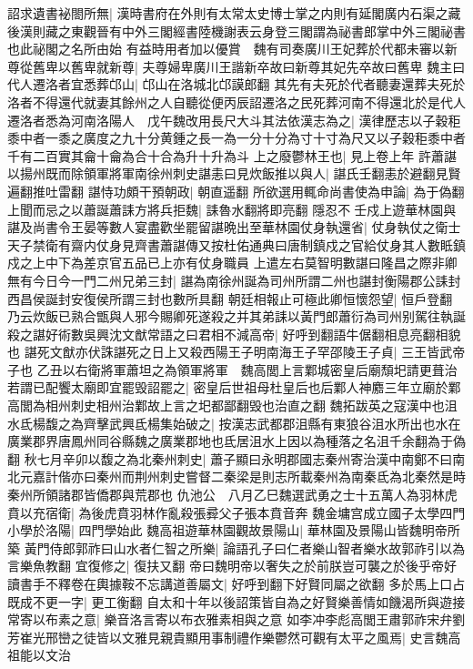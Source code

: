 詔求遺書袐閤所無|{
	漢時書府在外則有太常太史博士掌之内則有延閣廣内石渠之藏後漢則藏之東觀晉有中外三閣經書陸機謝表云身登三閣謂為祕書郎掌中外三閣祕書也此祕閣之名所由始}
有益時用者加以優賞　魏有司奏廣川王妃葬於代都未審以新尊從舊卑以舊卑就新尊|{
	夫尊婦卑廣川王諧新卒故曰新尊其妃先卒故曰舊卑}
魏主曰代人遷洛者宜悉葬邙山|{
	邙山在洛城北邙謨郎翻}
其先有夫死於代者聽妻還葬夫死於洛者不得還代就妻其餘州之人自聽從便丙辰詔遷洛之民死葬河南不得還北於是代人遷洛者悉為河南洛陽人　戊午魏改用長尺大斗其法依漢志為之|{
	漢律歷志以子穀秬黍中者一黍之廣度之九十分黄鍾之長一為一分十分為寸十寸為尺又以子穀秬黍中者千有二百實其龠十龠為合十合為升十升為斗}
上之廢鬱林王也|{
	見上卷上年}
許蕭諶以揚州既而除領軍將軍南徐州刺史諶恚曰見炊飯推以與人|{
	諶氏壬翻恚於避翻見賢遍翻推吐雷翻}
諶恃功頗干預朝政|{
	朝直遥翻}
所欲選用輒命尚書使為申論|{
	為于偽翻}
上聞而忌之以蕭誕蕭誄方將兵拒魏|{
	誄魯水翻將即亮翻}
隱忍不壬戍上遊華林園與諶及尚書令王晏等數人宴盡歡坐罷留諶晩出至華林園仗身執還省|{
	仗身執仗之衛士天子禁衛有齋内仗身見齊書蕭諶傳又按杜佑通典曰唐制鎮戍之官給仗身其人數眡鎮戍之上中下為差京官五品已上亦有仗身職員}
上遣左右莫智明數諶曰隆昌之際非卿無有今日今一門二州兄弟三封|{
	諶為南徐州誕為司州所謂二州也諶封衡陽郡公誄封西昌侯誕封安復侯所謂三封也數所具翻}
朝廷相報止可極此卿恒懷怨望|{
	恒戶登翻}
乃云炊飯已熟合甑與人邪今賜卿死遂殺之并其弟誄以黃門郎蕭衍為司州别駕往執誕殺之諶好術數吳興沈文猷常語之曰君相不減高帝|{
	好呼到翻語牛倨翻相息亮翻相貌也}
諶死文猷亦伏誅諶死之日上又殺西陽王子明南海王子罕邵陵王子貞|{
	三王皆武帝子也}
乙丑以右衛將軍蕭坦之為領軍將軍　魏高閭上言鄴城密皇后廟頹圯請更葺治若謂已配饗太廟即宜罷毁詔罷之|{
	密皇后世祖母杜皇后也后鄴人神䴥三年立廟於鄴高閭為相州刺史相州治鄴故上言之圯都鄙翻毁也治直之翻}
魏拓跋英之寇漢中也沮水氐楊馥之為齊擊武興氐楊集始破之|{
	按漢志武都郡沮縣有東狼谷沮水所出也水在廣業郡界唐鳳州同谷縣魏之廣業郡地也氐居沮水上因以為種落之名沮千余翻為于偽翻}
秋七月辛卯以馥之為北秦州刺史|{
	蕭子顯曰永明郡國志秦州寄治漢中南鄭不曰南北元嘉計偕亦曰秦州而荆州刺史嘗督二秦梁是則志所載秦州為南秦氐為北秦然是時秦州所領諸郡皆僑郡與荒郡也}
仇池公　八月乙巳魏選武勇之士十五萬人為羽林虎賁以充宿衛|{
	為後虎賁羽林作亂殺張彛父子張本賁音奔}
魏金墉宫成立國子太學四門小學於洛陽|{
	四門學始此}
魏高祖遊華林園觀故景陽山|{
	華林園及景陽山皆魏明帝所築}
黃門侍郎郭祚曰山水者仁智之所樂|{
	論語孔子曰仁者樂山智者樂水故郭祚引以為言樂魚教翻}
宜復修之|{
	復扶又翻}
帝曰魏明帝以奢失之於前朕豈可襲之於後乎帝好讀書手不釋卷在輿據鞍不忘講道善屬文|{
	好呼到翻下好賢同屬之欲翻}
多於馬上口占既成不更一字|{
	更工衡翻}
自太和十年以後詔策皆自為之好賢樂善情如饑渴所與遊接常寄以布素之意|{
	樂音洛言寄以布衣雅素相與之意}
如李冲李彪高閭王肅郭祚宋弁劉芳崔光邢巒之徒皆以文雅見親貴顯用事制禮作樂鬱然可觀有太平之風焉|{
	史言魏高祖能以文治}
